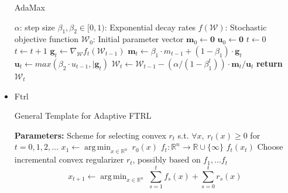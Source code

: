\documentclass{article}
\DeclareMathOperator*{\argmin}{arg\,min}
\newcommand{\R}{\ensuremath{\mathbb{R}}}
\newcommand{\ti}{_{t+1}}
\begin{document}
\begin{itemize}
    \begin{algorithm}[H]
      \caption{AdaMax}
      \begin{algorithmic}[1]
        \Require $\alpha$: step size
        \Require $\beta_1, \beta_2 \in [0,1)$: Exponential decay rates
        \Require $f(\mathcal{W})$: Stochastic objective function
        \Require $\mathcal{W}_0$: Initial parameter vector
        \State $\bm{m}_0 \gets \bm{0}$ 
        \State $\bm{u}_0 \gets \bm{0}$ 
        \State $t \gets 0$ 
          \State $t\gets t+1$
          \State $\bm{g}_t \gets \nabla_{\mathcal{W}}f_t(\mathcal{W}_{t-1})$ 
          \State $\bm{m}_t \gets \beta_1 \cdot m_{t-1} + (1-\beta_1) \cdot \bm{g}_t$ 
          \State $\bm{u}_t \gets max(\beta_2 \cdot u_{t-1}, \vert{\bm{g}_t})$ 
          \State $\mathcal{W}_t \gets \mathcal{W}_{t-1} - (\alpha/ (1-\beta_1^t)) \cdot \bm{m}_t/\bm{u}_t$ 
        \EndWhile
        \State \textbf{return} $\mathcal{W}_t$ 
      \end{algorithmic}
    \end{algorithm}

  \item Ftrl

    \begin{algorithm}[H]
      \caption{General Template for Adaptive FTRL}
      \begin{algorithmic}
        \State \textbf{Parameters:} Scheme for selecting convex $r_t$ s.t. $\forall x,\ r_t(x) \ge 0$ for $t=0,1,2, \dots$
        \State $x_1 \leftarrow \argmin_{x \in \R^n}\ r_0(x)$
          \State $f_t: \R^n \rightarrow \R \cup \{\infty\}$ 
          \State $f_t(x_t)$ 
          \State Choose incremental convex regularizer $r_t$, possibly based on $f_1, \dots f_t$
          \State \[x\ti \leftarrow \argmin_{x \in \R^n}\ \sum_{s=1}^t f_s(x) + \sum_{s=0}^t r_s(x)\] 
        \EndFor
      \end{algorithmic}
    \end{algorithm}

\end{itemize}
\end{document}
